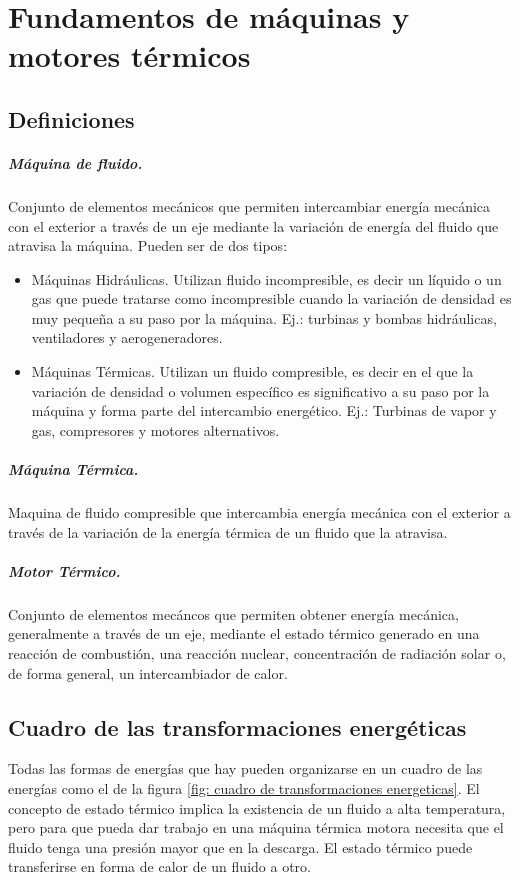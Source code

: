 \chapter{Fundamentos de máquinas y motores térmicos}
\section{Definiciones}
\paragraph{Máquina de fluido.} Conjunto de elementos mecánicos que permiten intercambiar energía mecánica con el exterior a través de un eje mediante la variación de energía del fluido que atravisa la máquina. Pueden ser de dos tipos:
\begin{itemize}
    \item Máquinas Hidráulicas. Utilizan fluido incompresible, es decir un líquido o un gas que puede tratarse como incompresible cuando la variación de densidad es muy pequeña a su paso por la máquina. Ej.: turbinas y bombas hidráulicas, ventiladores y aerogeneradores.
    \item Máquinas Térmicas. Utilizan un fluido compresible, es decir en el que la variación de densidad o volumen específico es significativo a su paso por la máquina y forma parte del intercambio energético. Ej.: Turbinas de vapor y gas, compresores y motores alternativos.
\end{itemize}

\paragraph{Máquina Térmica.} Maquina de fluido compresible que intercambia energía mecánica con el exterior a través de la variación de la energía térmica de un fluido que la atravisa.

\paragraph{Motor Térmico.} Conjunto de elementos mecáncos que permiten obtener energía mecánica, generalmente a través de un eje, mediante el estado térmico generado en una reacción de combustión, una reacción nuclear, concentración de radiación solar o, de forma general, un intercambiador de calor.

\section{Cuadro de las transformaciones energéticas}
Todas las formas de energías que hay pueden organizarse en un cuadro de las energías como el de la figura \ref{fig: cuadro de transformaciones energeticas}. El concepto de estado térmico implica la existencia de un fluido a alta temperatura, pero para que pueda dar trabajo en una máquina térmica motora necesita que el fluido tenga una presión mayor que en la descarga. El estado térmico puede transferirse en forma de calor de un fluido a otro.

